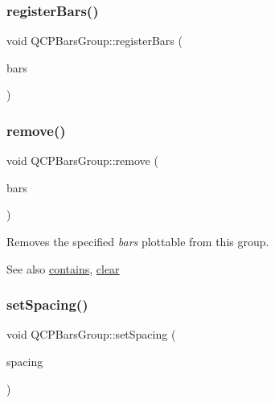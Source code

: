 \mbox{\label{class_q_c_p_bars_group_a7b00514f19ad58d0bb3fd5246a67fae2}} 
\subsubsection{\texorpdfstring{registerBars()}{registerBars()}}
{\footnotesize\ttfamily void Q\+C\+P\+Bars\+Group\+::register\+Bars (\begin{DoxyParamCaption}\item[{\mbox{\hyperlink{class_q_c_p_bars}{Q\+C\+P\+Bars}} $\ast$}]{bars }\end{DoxyParamCaption})\hspace{0.3cm}{\ttfamily [protected]}}

\mbox{\label{class_q_c_p_bars_group_a215e28a5944f1159013a0e19169220e7}} 
\subsubsection{\texorpdfstring{remove()}{remove()}}
{\footnotesize\ttfamily void Q\+C\+P\+Bars\+Group\+::remove (\begin{DoxyParamCaption}\item[{\mbox{\hyperlink{class_q_c_p_bars}{Q\+C\+P\+Bars}} $\ast$}]{bars }\end{DoxyParamCaption})}

Removes the specified {\itshape bars} plottable from this group.

\begin{DoxySeeAlso}{See also}
\mbox{\hyperlink{class_q_c_p_bars_group_ae26da07a23553052a178fb3fae90d0dc}{contains}}, \mbox{\hyperlink{class_q_c_p_bars_group_a3ddf23928c6cd89530bd34ab7ba7b177}{clear}} 
\end{DoxySeeAlso}
\mbox{\label{class_q_c_p_bars_group_aa553d327479d72a0c3dafcc724a190e2}} 
\subsubsection{\texorpdfstring{setSpacing()}{setSpacing()}}
{\footnotesize\ttfamily void Q\+C\+P\+Bars\+Group\+::set\+Spacing (\begin{DoxyParamCaption}\item[{double}]{spacing }\end{DoxyParamCaption})}

